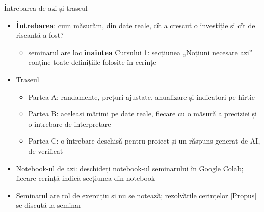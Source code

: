 \begin{frame}{Întrebarea de azi și traseul}
\itemsize{\small}
\begin{itemize}
    \item \textbf{Întrebarea}: cum măsurăm, din date reale, cît a crescut o investiție și cît de riscantă a fost?
    \begin{itemize}
        \item seminarul are loc \textbf{înaintea} Cursului 1: secțiunea „Noțiuni necesare azi” conține toate definițiile folosite în cerințe
    \end{itemize}
    \item Traseul
    \begin{itemize}
        \item Partea A: randamente, prețuri ajustate, anualizare și indicatori pe hîrtie
        \item Partea B: aceleași mărimi pe date reale, fiecare cu o măsură a preciziei și o întrebare de interpretare
        \item Partea C: o întrebare deschisă pentru proiect și un răspuns generat de AI, de verificat
    \end{itemize}
    \item Notebook-ul de azi: \href{\nb}{deschideți notebook-ul seminarului în Google Colab}; fiecare cerință indică secțiunea din notebook
    \item Seminarul are rol de exercițiu și nu se notează; rezolvările cerințelor [Propus] se discută la seminar
\end{itemize}
\end{frame}


